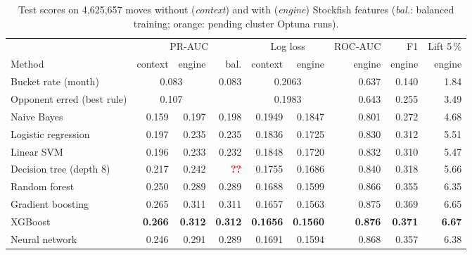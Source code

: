 \documentclass[a4paper,oneside,bibliography=totoc]{scrbook}
\newcommand{\tbd}{\textcolor{red}{\textbf{??}}}
\newcommand{\stale}[1]{\textcolor{BurntOrange}{#1}}
\begin{document}
\begin{table}[t!]
  \centering\scriptsize\setlength{\tabcolsep}{3.2pt}
  \caption{Test scores on 4,625,657 moves without (\emph{context}) and with (\emph{engine}) Stockfish
    features (\emph{bal.}: balanced training; orange: pending cluster Optuna runs).}
  \label{tab:results}
  \begin{tabular}{@{}lrrrrrrrr@{}}
    \toprule
     & \multicolumn{3}{c}{PR-AUC} & \multicolumn{2}{c}{Log loss} & ROC-AUC & F1 & Lift 5\,\% \\
    \cmidrule(lr){2-4}\cmidrule(lr){5-6}
    Method & context & engine & bal. & context & engine & engine & engine & engine \\
    \midrule
    Bucket rate (month) & \multicolumn{2}{c}{0.083} & 0.083 & \multicolumn{2}{c}{0.2063} & 0.637 & 0.140 & 1.84 \\
    Opponent erred (best rule) & \multicolumn{2}{c}{0.107} & & \multicolumn{2}{c}{0.1983} & 0.643 & 0.255 & 3.49 \\
    Naive Bayes & 0.159 & 0.197 & 0.198 & \stale{0.1949} & \stale{0.1847} & 0.801 & 0.272 & 4.68 \\
    Logistic regression & 0.197 & 0.235 & 0.235 & 0.1836 & 0.1725 & 0.830 & 0.312 & 5.51 \\
    \stale{Linear SVM} & \stale{0.196} & \stale{0.233} & \stale{0.232} & \stale{0.1848} & \stale{0.1720} & \stale{0.832} & \stale{0.310} & \stale{5.47} \\
    Decision tree (depth 8) & 0.217 & 0.242 & \tbd & 0.1755 & 0.1686 & 0.840 & 0.318 & 5.66 \\
    \stale{Random forest} & \stale{0.250} & \stale{0.289} & \stale{0.289} & \stale{0.1688} & \stale{0.1599} & \stale{0.866} & \stale{0.355} & \stale{6.35} \\
    Gradient boosting & 0.265 & 0.311 & 0.311 & 0.1657 & 0.1563 & 0.875 & 0.369 & 6.65 \\
    XGBoost & \textbf{0.266} & \textbf{0.312} & \textbf{0.312} & \textbf{0.1656} & \textbf{0.1560} & \textbf{0.876} & \textbf{0.371} & \textbf{6.67} \\
    \stale{Neural network} & \stale{0.246} & \stale{0.291} & \stale{0.289} & \stale{0.1691} & \stale{0.1594} & \stale{0.868} & \stale{0.357} & \stale{6.38} \\
    \bottomrule
  \end{tabular}
\end{table}
\end{document}
